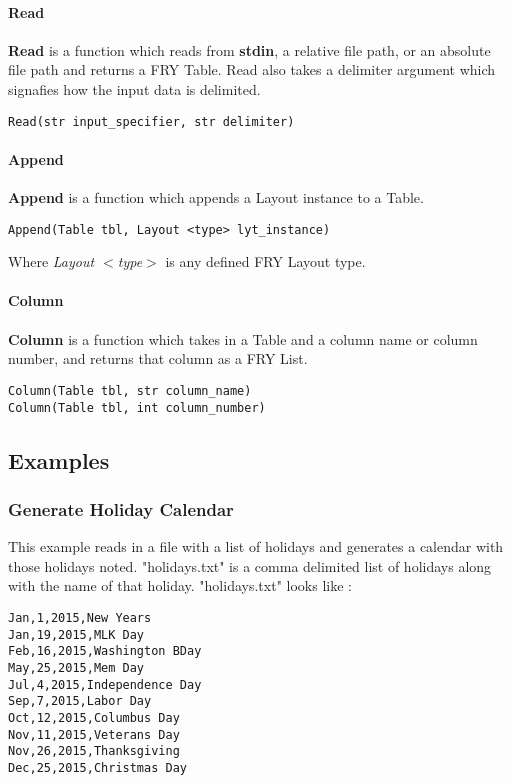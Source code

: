 \documentclass{article}
\begin{document}
\paragraph{Read}
\textbf{Read} is a function which reads from \textbf{stdin}, a relative file path, or an absolute file path and returns a FRY Table. Read also takes a delimiter argument which signafies how the input data is delimited.
\begin{lstlisting}
Read(str input_specifier, str delimiter)
\end{lstlisting}

\paragraph{Append}
\textbf{Append} is a function which appends a Layout instance to a Table.
\begin{lstlisting}
Append(Table tbl, Layout <type> lyt_instance)
\end{lstlisting}
Where \emph{Layout $<$type$>$} is any defined FRY Layout type.

\paragraph{Column}
\textbf{Column} is a function which takes in a Table and a column name or column number, and returns that column as a FRY List.
\begin{lstlisting}
Column(Table tbl, str column_name)
Column(Table tbl, int column_number)
\end{lstlisting}

\subsection{Examples}
\subsubsection{Generate Holiday Calendar}
\label{sec:cal_example}
This example reads in a file with a list of holidays and generates a calendar with those holidays noted. "holidays.txt" is a comma delimited list of holidays along with the name of that holiday. "holidays.txt" looks like :
\begin{lstlisting}
Jan,1,2015,New Years
Jan,19,2015,MLK Day
Feb,16,2015,Washington BDay
May,25,2015,Mem Day
Jul,4,2015,Independence Day
Sep,7,2015,Labor Day
Oct,12,2015,Columbus Day
Nov,11,2015,Veterans Day
Nov,26,2015,Thanksgiving
Dec,25,2015,Christmas Day
\end{lstlisting}
\end{document}
